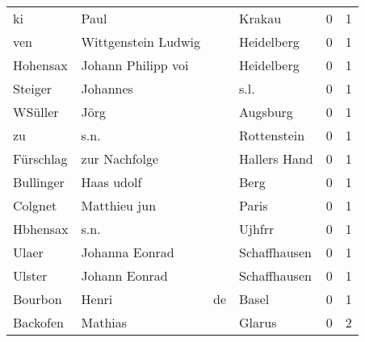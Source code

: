 \begin{center}
\begin{tiny}
\begin{longtabu}{llllrr}
                       ki &                               Paul &             &                                      Krakau &          0 &         1 \\
                      ven &                Wittgenstein Ludwig &             &                                  Heidelberg &          0 &         1 \\
                 Hohensax &                 Johann Philipp voi &             &                                  Heidelberg &          0 &         1 \\
                  Steiger &                           Johannes &             &                                        s.l. &          0 &         1 \\
                  WSüller &                               Jörg &             &                                    Augsburg &          0 &         1 \\
                       zu &                               s.n. &             &                                 Rottenstein &          0 &         1 \\
                Fürschlag &                      zur Nachfolge &             &                                Hallers Hand &          0 &         1 \\
                Bullinger &                         Haas udolf &             &                                        Berg &          0 &         1 \\
                  Colgnet &                       Matthieu jun &             &                                       Paris &          0 &         1 \\
                 Hbhensax &                               s.n. &             &                                      Ujhfrr &          0 &         1 \\
                    Ulaer &                     Johanna Eonrad &             &                                Schaffhausen &          0 &         1 \\
                   Ulster &                      Johann Eonrad &             &                                Schaffhausen &          0 &         1 \\
                  Bourbon &                              Henri &          de &                                       Basel &          0 &         1 \\
                 Backofen &                            Mathias &             &                                      Glarus &          0 &         2 \\

\end{longtabu}
\end{tiny}
\end{center}
